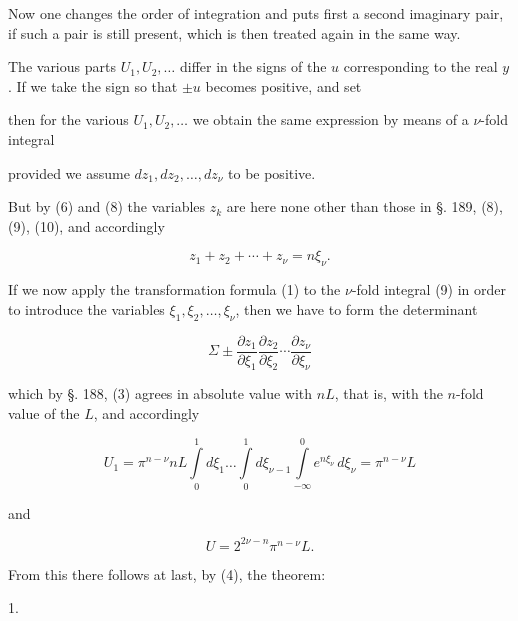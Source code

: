Now one changes the order of integration and puts first a second imaginary pair, if such a pair is still present, which is then treated again in the same way.

The various parts $U_1, U_2, \ldots$ differ in the signs of the $u$ corresponding to the real $y$. If we take the sign so that $\pm u$ becomes positive, and set


then for the various $U_1, U_2, \ldots$ we obtain the same expression by means of a $\nu$-fold integral


provided we assume $dz_1, dz_2, \ldots, dz_\nu$ to be positive.

But by (6) and (8) the variables $z_k$ are here none other than those in §. 189, (8), (9), (10), and accordingly

\[
z_1+z_2+\cdots+z_\nu = n\xi_\nu.
\]

If we now apply the transformation formula (1) to the $\nu$-fold integral (9) in order to introduce the variables $\xi_1, \xi_2, \ldots, \xi_\nu$, then we have to form the determinant

\[
\Sigma\pm\frac{\partial z_1}{\partial\xi_1}\frac{\partial z_2}{\partial\xi_2}\cdots\frac{\partial z_\nu}{\partial\xi_\nu}
\]

which by §. 188, (3) agrees in absolute value with $nL$, that is, with the $n$-fold value of the  $L$, and accordingly

\[
U_1 = \pi^{n-\nu}nL\int\limits_0^1 d\xi_1\ldots\int\limits_0^1 d\xi_{\nu-1}\int\limits_{-\infty}^0 e^{n\xi_\nu}\,d\xi_\nu = \pi^{n-\nu}L
\]

and

\[
U = 2^{2\nu-n}\pi^{n-\nu}L.
\]

From this there follows at last, by (4), the theorem:

1. 



